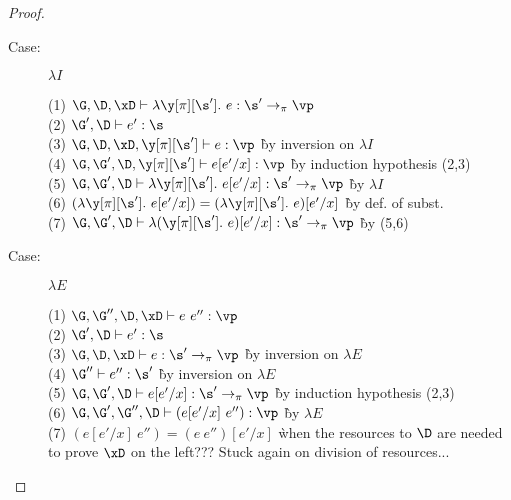 \begin{proof}
\begin{description}
\item[Case:] $\lambda I$
\begin{tabbing}
    (1) $\G, \D, \xD \vdash \lambda \y[\pi][\s'].~e : \s' \to_\pi \vp$\\
    (2) $\G', \D \vdash e' : \s$\\
    (3) $\G, \D, \xD, \y[\pi][\s'] \vdash e : \vp$ \` by inversion on $\lambda I$\\
    (4) $\G, \G', \D, \y[\pi][\s'] \vdash e[e'/x] : \vp$ \` by induction hypothesis (2,3)\\
    (5) $\G, \G', \D \vdash \lambda \y[\pi][\s'].~e[e'/x] : \s' \to_\pi \vp$ \` by $\lambda I$\\
    (6) $(\lambda \y[\pi][\s'].~e[e'/x]) = (\lambda \y[\pi][\s'].~e)[e'/x]$ \` by def. of subst.\\
    (7) $\G, \G', \D \vdash \lambda (\y[\pi][\s'].~e)[e'/x] : \s' \to_\pi \vp$ \` by (5,6)\\
\end{tabbing}

\item[Case:] $\lambda E$
\begin{tabbing}
    (1) $\G, \G'', \D, \xD \vdash e~e'' : \vp$\\
    (2) $\G', \D \vdash e' : \s$\\
    (3) $\G, \D, \xD \vdash e : \s' \to_\pi \vp$ \` by inversion on $\lambda E$\\
    (4) $\G'' \vdash e'' : \s'$ \` by inversion on $\lambda E$\\
    (5) $\G, \G', \D \vdash e[e'/x] : \s' \to_\pi \vp$ \` by induction hypothesis (2,3)\\
    (6) $\G, \G', \G'', \D \vdash (e[e'/x]~e'') : \vp$ \` by $\lambda E$\\
    (7) $(e[e'/x]~e'') = (e~e'')[e'/x]$ \` when the resources to $\D$ are needed
    to prove $\xD$ on the left??? Stuck again on division of resources...
\end{tabbing}

\end{description}

\end{proof}

